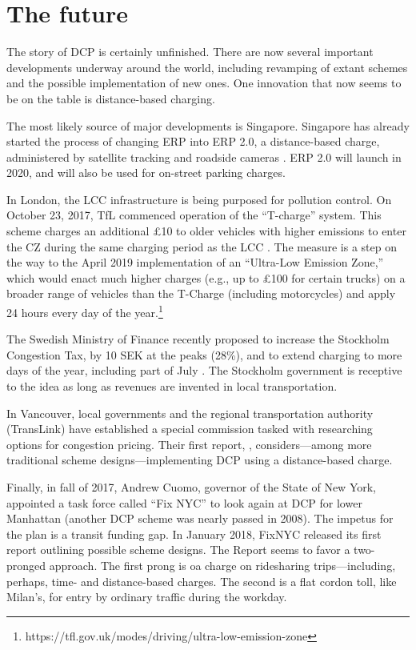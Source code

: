 \section{The future}\label{sec:future}

The story of DCP is certainly unfinished. There are now several important developments underway around the world, including revamping of extant schemes and the possible implementation of new ones. One innovation that now seems to be on the table is distance-based charging.

The most likely source of major developments is Singapore. Singapore has already started the process of changing ERP into ERP 2.0, a distance-based charge, administered by satellite tracking and roadside cameras \citep{Straits2016}. ERP 2.0 will launch in 2020, and will also be used for on-street parking charges.

In London, the LCC infrastructure is being purposed for pollution control. On October 23, 2017, TfL commenced operation of the ``T-charge'' system. This scheme charges an additional \pounds 10 to older vehicles with higher emissions to enter the CZ during the same charging period as the LCC \citep{BBC2017}. The measure is a step on the way to the April 2019 implementation of an ``Ultra-Low Emission Zone,'' which would enact much higher charges (e.g., up to \pounds 100 for certain trucks) on a broader range of vehicles than the T-Charge (including motorcycles) and apply 24 hours every day of the year.\footnote{https://tfl.gov.uk/modes/driving/ultra-low-emission-zone} 

The Swedish Ministry of Finance recently proposed to increase the Stockholm Congestion Tax, by 10 SEK at the peaks (28\%), and to extend charging to more days of the year, including part of July \citep{Mitti2017}. The Stockholm government is receptive to the idea as long as revenues are invented in local transportation.

In Vancouver, local governments and the regional transportation authority (TransLink) have established a special commission tasked with researching options for congestion pricing. Their first report, \citep{vancouver2018}, considers---among more traditional scheme designs---implementing DCP using a distance-based charge. 

Finally, in fall of 2017, Andrew Cuomo, governor of the State of New York, appointed a task force called ``Fix NYC'' to look again at DCP for lower Manhattan (another DCP scheme was nearly passed in 2008). The impetus for the plan is a transit funding gap. In January 2018, FixNYC released its first report \citep{FixNYC2018} outlining possible scheme designs. The Report seems to favor a two-pronged approach. The first prong is  oa charge on ridesharing trips---including, perhaps, time- and distance-based charges. The second is a flat cordon toll, like Milan's, for entry by ordinary traffic during the workday. 

